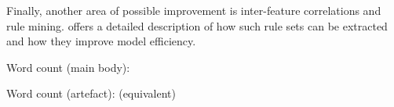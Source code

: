 Finally, another area of possible improvement is inter-feature correlations and rule mining. \cite{Jeeva} offers a detailed description of how such rule sets can be extracted and how they improve model efficiency.

\clearpage
\vspace*{\fill}
\begin{center}
\begin{minipage}{.6\textwidth}
\centering 
Word count (main body):

Word count (artefact): (equivalent)
\end{minipage}
\end{center}
\vfill
\clearpage